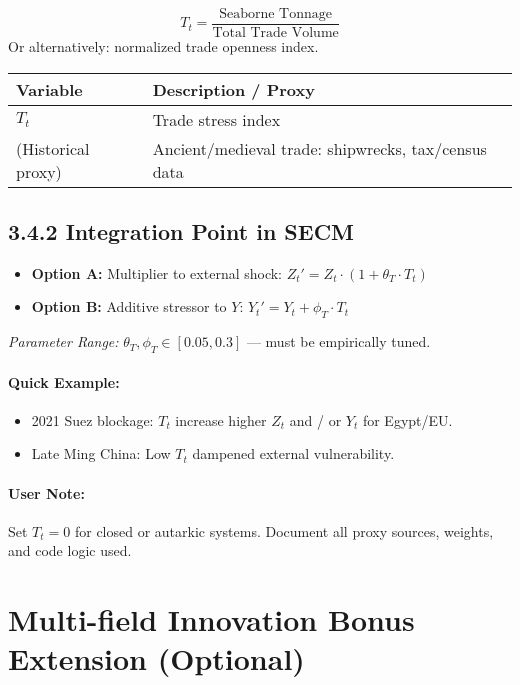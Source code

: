 \documentclass[12pt]{report}
\begin{document}
\[
T_t = \frac{\text{Seaborne Tonnage}}{\text{Total Trade Volume}}
\]
Or alternatively: normalized trade openness index.

\begin{table}[H]
\centering
\begin{tabular}{|l|p{8cm}|}
\hline
\textbf{Variable} & \textbf{Description / Proxy} \\
\hline
$T_t$ & Trade stress index \\
(Historical proxy) & Ancient/medieval trade: shipwrecks, tax/census data \\
\hline
\end{tabular}
\end{table}

\subsection*{3.4.2 Integration Point in SECM}
\begin{itemize}
  \item \textbf{Option A:} Multiplier to external shock: $Z_t' = Z_t \cdot (1 + \theta_T \cdot T_t)$
  \item \textbf{Option B:} Additive stressor to $Y$: $Y_t' = Y_t + \phi_T \cdot T_t$
\end{itemize}

\textit{Parameter Range:} $\theta_T, \phi_T \in [0.05, 0.3]$ — must be empirically tuned.

\paragraph{Quick Example:}
\begin{itemize}
  \item 2021 Suez blockage: $T_t$ increase higher $Z_t$ and / or $Y_t$ for Egypt/EU.
  \item Late Ming China: Low $T_t$ dampened external vulnerability.
\end{itemize}

\paragraph{User Note:}
Set $T_t = 0$ for closed or autarkic systems. Document all proxy sources, weights, and code logic used.

\section{Multi-field Innovation Bonus Extension (Optional)}
\end{document}
